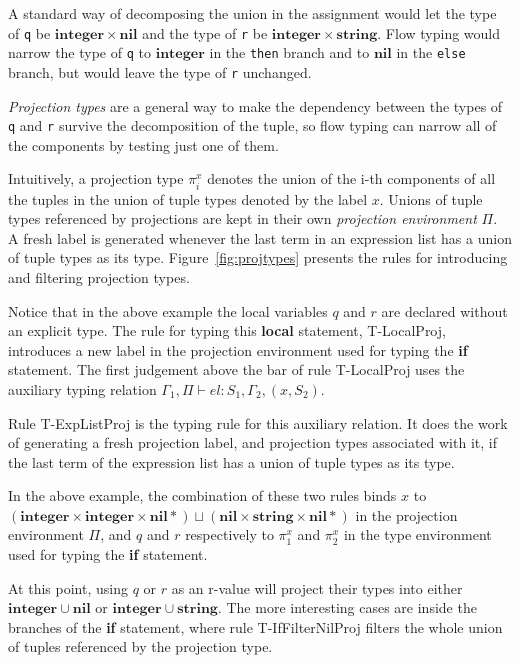 \documentclass[preprint]{sigplanconf}
\newcommand{\Nil}{\mathbf{nil}}
\newcommand{\Integer}{\mathbf{integer}}
\newcommand{\String}{\mathbf{string}}
\newcommand{\env}{\Gamma}
\newcommand{\penv}{\Pi}
\begin{document}
A standard way of decomposing the union in the assignment
would let the type of {\tt q} be $\Integer \times \Nil$ and
the type of {\tt r} be $\Integer \times \String$. Flow typing
would narrow the type of {\tt q} to $\Integer$ in the {\tt then}
branch and to $\Nil$ in the {\tt else} branch, but would
leave the type of {\tt r} unchanged.

{\em Projection types}
are a general way to make the dependency between the types
of {\tt q} and {\tt r} survive the decomposition of the tuple,
so flow typing can narrow all of the components by testing
just one of them.

Intuitively, a projection type $\pi_{i}^{x}$ denotes the union of
the i-th components of all the tuples in the union of tuple types
denoted by the label $x$. Unions of tuple types referenced by projections are kept in their own {\em projection environment} $\Pi$. A fresh label is generated whenever the last term
in an expression list has a union of tuple types as its type.
Figure~\ref{fig:projtypes} presents the rules for introducing and filtering projection types.

Notice that in the above example the local variables $q$ and $r$ are declared without an explicit type. 
 The rule for typing this {\bf local} statement,
{\sc T-LocalProj}, introduces a new label in the projection
environment used for typing the {\bf if} statement.
The first judgement above the bar of rule {\sc T-LocalProj} uses the auxiliary typing relation $\env_{1}, \penv \vdash el : S_{1}, \env_{2}, (x,S_{2})$.

Rule {\sc T-ExpListProj} is the typing rule for this auxiliary
relation. It does the work of generating a fresh projection label,
and projection types associated with it, if the last term of
the expression list has a union of tuple types as its type.

In the above example, the combination of these two rules binds $x$ to
$(\Integer \times \Integer \times \Nil{*}) \sqcup (\Nil \times \String \times \Nil{*})$ in the projection environment $\Pi$,
and $q$ and $r$ respectively to $\pi_{1}^{x}$ and $\pi_{2}^{x}$
in the type environment used for typing the {\bf if} statement.

At this point, using $q$ or $r$ as an r-value will project
their types into either $\Integer \cup \Nil$ or $\Integer \cup \String$. The more interesting cases are inside the
branches of the {\bf if} statement, where rule {\sc T-IfFilterNilProj} filters the whole union of tuples referenced
by the projection type.
\end{document}
